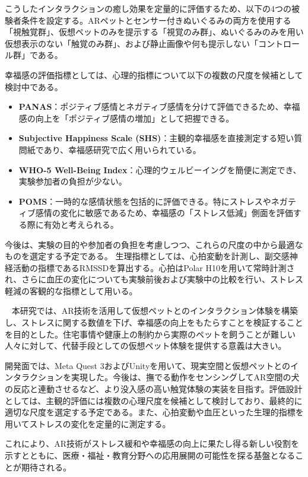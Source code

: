 \documentclass[a4j]{ltjsarticle}
\newcounter{seccnt}
\newcommand{\usection}[1]{\ \newline{\bf\underline{\theseccnt\stepcounter{seccnt}. #1}\hspace{10pt}}}
\begin{document}
こうしたインタラクションの癒し効果を定量的に評価するため、以下の4つの被験者条件を設定する。ARペットとセンサー付きぬいぐるみの両方を使用する「視触覚群」、仮想ペットのみを提示する「視覚のみ群」、ぬいぐるみのみを用い仮想表示のない「触覚のみ群」、および静止画像や何も提示しない「コントロール群」である。

幸福感の評価指標としては、心理的指標について以下の複数の尺度を候補として検討中である。

\begin{itemize}
  \item \textbf{PANAS}：ポジティブ感情とネガティブ感情を分けて評価できるため、幸福感の向上を「ポジティブ感情の増加」として把握できる。
  \item \textbf{Subjective Happiness Scale (SHS)}：主観的幸福感を直接測定する短い質問紙であり、幸福感研究で広く用いられている。
  \item \textbf{WHO-5 Well-Being Index}：心理的ウェルビーイングを簡便に測定でき、実験参加者の負担が少ない。
  \item \textbf{POMS}：一時的な感情状態を包括的に評価できる。特にストレスやネガティブ感情の変化に敏感であるため、幸福感の「ストレス低減」側面を評価する際に有効と考えられる。
\end{itemize}

今後は、実験の目的や参加者の負担を考慮しつつ、これらの尺度の中から最適なものを選定する予定である。
生理指標としては、心拍変動を計測し、副交感神経活動の指標であるRMSSDを算出する。心拍はPolar H10を用いて常時計測され、さらに血圧の変化についても実験前後および実験中の比較を行い、ストレス軽減の客観的な指標として用いる。


\usection{まとめ}
本研究では、AR技術を活用して仮想ペットとのインタラクション体験を構築し、ストレスに関する数値を下げ、幸福感の向上をもたらすことを検証することを目的とした。住宅事情や健康上の制約から実際のペットを飼うことが難しい人々に対して、代替手段としての仮想ペット体験を提供する意義は大きい。

開発面では、Meta Quest 3およびUnityを用いて、現実空間と仮想ペットとのインタラクションを実現した。今後は、撫でる動作をセンシングしてAR空間の犬の反応と連動させるなど、より没入感の高い触覚体験の実装を目指す。評価設計としては、主観的評価には複数の心理尺度を候補として検討しており、最終的に適切な尺度を選定する予定である。また、心拍変動や血圧といった生理的指標を用いてストレスの変化を定量的に測定する。

これにより、AR技術がストレス緩和や幸福感の向上に果たし得る新しい役割を示すとともに、医療・福祉・教育分野への応用展開の可能性を探る基盤となることが期待される。
\end{document}
